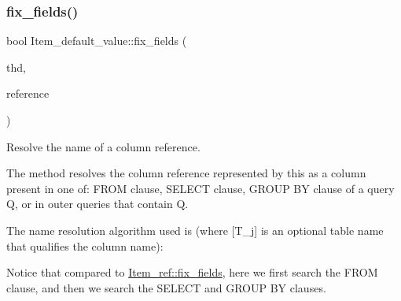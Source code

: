 \subsubsection{\texorpdfstring{fix\+\_\+fields()}{fix\_fields()}}
{\footnotesize\ttfamily bool Item\+\_\+default\+\_\+value\+::fix\+\_\+fields (\begin{DoxyParamCaption}\item[{T\+HD $\ast$}]{thd,  }\item[{\mbox{\hyperlink{classItem}{Item}} $\ast$$\ast$}]{reference }\end{DoxyParamCaption})\hspace{0.3cm}{\ttfamily [virtual]}}

Resolve the name of a column reference.

The method resolves the column reference represented by \textquotesingle{}this\textquotesingle{} as a column present in one of\+: F\+R\+OM clause, S\+E\+L\+E\+CT clause, G\+R\+O\+UP BY clause of a query Q, or in outer queries that contain Q.

The name resolution algorithm used is (where \mbox{[}T\+\_\+j\mbox{]} is an optional table name that qualifies the column name)\+:


\begin{DoxyCode}{0}
\DoxyCodeLine{\{}
\DoxyCodeLine{}
\DoxyCodeLine{  \{}
\DoxyCodeLine{    \{}
\DoxyCodeLine{}
\DoxyCodeLine{    \}}
\DoxyCodeLine{  \}}
\DoxyCodeLine{\}}
\end{DoxyCode}


Notice that compared to \mbox{\hyperlink{classItem__ref_a6a78e05b0db89e799f61808c621b808f}{Item\+\_\+ref\+::fix\+\_\+fields}}, here we first search the F\+R\+OM clause, and then we search the S\+E\+L\+E\+CT and G\+R\+O\+UP BY clauses.


